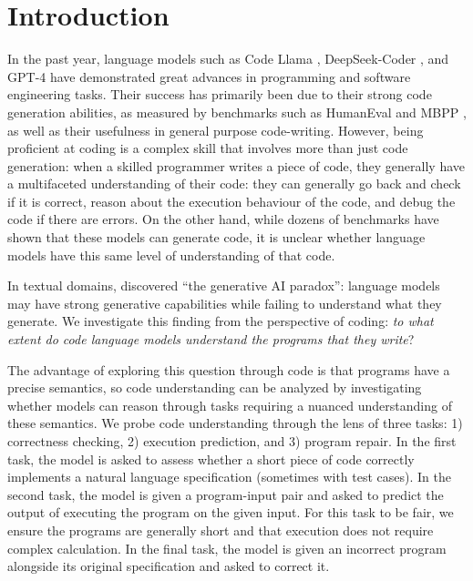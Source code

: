 \section{Introduction}
In the past year, language models such as Code Llama \citep{roziere2023code}, DeepSeek-Coder \citep{guo2024deepseek}, and GPT-4 \citep{openai2023gpt} have demonstrated great advances in programming and software engineering tasks. Their success has primarily been due to their strong code generation abilities, as measured by benchmarks such as HumanEval \citep{chen2021evaluating} and MBPP \citep{austin2021program}, as well as their usefulness in general purpose code-writing. However, being proficient at coding is a complex skill that involves more than just code generation: when a skilled programmer writes a piece of code, they generally have a multifaceted understanding of their code: they can generally go back and check if it is correct, reason about the execution behaviour of the code, and debug the code if there are errors. On the other hand, while dozens of benchmarks have shown that these models can generate code, it is unclear whether language models have this same level of understanding of that code.

In textual domains, \citet{west2023generative} discovered ``the generative AI paradox'': language models may have strong generative capabilities while failing to understand what they generate. We investigate this finding from the perspective of coding: \textit{to what extent do code language models understand the programs that they write}? 

The advantage of exploring this question through code is that programs have a precise semantics, so code understanding can be analyzed by investigating whether models can reason through tasks requiring a nuanced understanding of these semantics. We probe code understanding through the lens of three tasks: 1) correctness checking, 2) execution prediction, and 3) program repair. In the first task, the model is asked to assess whether a short piece of code correctly implements a natural language specification (sometimes with test cases). In the second task, the model is given a program-input pair and asked to predict the output of executing the program on the given input. For this task to be fair, we ensure the programs are generally short and that execution does not require complex calculation. In the final task, the model is given an incorrect program alongside its original specification and asked to correct it. 

